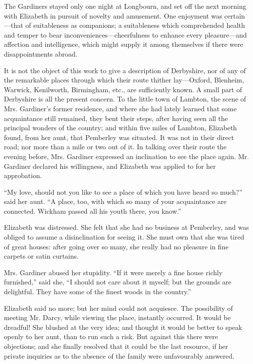 \documentclass[10pt]{book}
\begin{document}
   The Gardiners stayed only one night at Longbourn, and set off the next
morning with Elizabeth in pursuit of novelty and amusement. One
enjoyment was certain—that of suitableness as companions; a
suitableness which comprehended health and temper to bear
inconveniences—cheerfulness to enhance every pleasure—and affection
and intelligence, which might supply it among themselves if there were
disappointments abroad.
  

   It is not the object of this work to give a description of Derbyshire,
nor of any of the remarkable places through which their route thither
lay—Oxford, Blenheim, Warwick, Kenilworth, Birmingham, etc., are
sufficiently known. A small part of Derbyshire is all the present
concern. To the little town of Lambton, the scene of Mrs. Gardiner’s
former residence, and where she had lately learned that some
acquaintance still remained, they bent their steps, after having seen
all the principal wonders of the country; and within five miles of
Lambton, Elizabeth found, from her aunt, that Pemberley was situated. It
was not in their direct road; nor more than a mile or two out of it. In
talking over their route the evening before, Mrs. Gardiner expressed an
inclination to see the place again. Mr. Gardiner declared his
willingness, and Elizabeth was applied to for her approbation.
  

   “My love, should not you like to see a place of which you have heard so
much?” said her aunt. “A place, too, with which so many of your
acquaintance are connected. Wickham passed all his youth there, you
know.”
  

   Elizabeth was distressed. She felt that she had no
   business at
Pemberley, and was obliged to assume a disinclination for seeing it. She
must own that she was tired of great houses: after going over so many,
she really had no pleasure in fine carpets or satin curtains.
  

   Mrs. Gardiner abused her stupidity. “If it were merely a fine house
richly furnished,” said she, “I should not care about it myself; but the
grounds are delightful. They have some of the finest woods in the
country.”
  

   Elizabeth said no more; but her mind could not acquiesce. The
possibility of meeting Mr. Darcy, while viewing the place, instantly
occurred. It would be dreadful! She blushed at the very idea; and
thought it would be better to speak openly to her aunt, than to run such
a risk. But against this there were objections; and she finally resolved
that it could be the last resource, if her private inquiries as to the
absence of the family were unfavourably answered.
  
\end{document}
